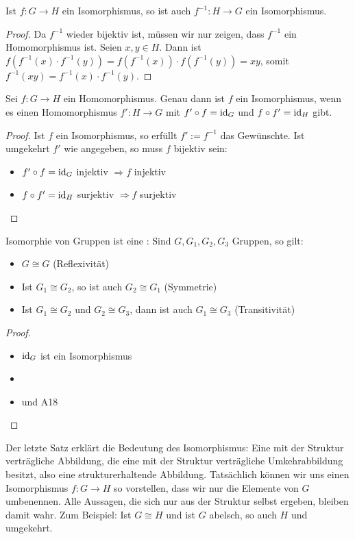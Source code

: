 \begin{lemma}
	Ist $f:G\to H$ ein Isomorphismus, so ist auch $f^{-1}:H\to G$ ein Isomorphismus.
\end{lemma}
\begin{proof}
	Da $f^{-1}$ wieder bijektiv ist, müssen wir nur zeigen, dass $f^{-1}$ ein Homomorphismus ist. Seien $x,y\in H$. Dann 
	ist $f(f^{-1}(x)\cdot f^{-1}(y))=f(f^{-1}(x))\cdot f(f^{-1}(y))=xy$, somit $f^{-1}(xy)=f^{-1}(x)\cdot f^{-1}(y)$.
\end{proof}

\begin{proposition}
	Sei $f:G\to H$ ein Homomorphismus. Genau dann ist $f$ ein Isomorphismus, wenn es einen Homomorphismus 
	$f':H\to G$ mit $f'\circ f=\operatorname{id}_G$ und $f\circ f'=\operatorname{id}_H$ gibt.
\end{proposition}
\begin{proof}
	Ist $f$ ein Isomorphismus, so erfüllt $f':=f^{-1}$ das Gewünschte. Ist umgekehrt $f'$ wie angegeben, so muss $f$ 
	bijektiv sein:
	\begin{itemize}
		\item $f'\circ f=\operatorname{id}_G$ injektiv $\Rightarrow f$ injektiv
		\item $f\circ f'=\operatorname{id}_H$ surjektiv $\Rightarrow f$ surjektiv
	\end{itemize}
\end{proof}

\begin{conclusion}
	Isomorphie von Gruppen ist eine : Sind $G,G_1,G_2,G_3$ Gruppen, so gilt:
	\begin{itemize}
		\item $G\cong G$ (Reflexivität)
		\item Ist $G_1\cong G_2$, so ist auch $G_2\cong G_1$ (Symmetrie)
		\item Ist $G_1\cong G_2$ und $G_2\cong G_3$, dann ist auch $G_1\cong G_3$ (Transitivität)
	\end{itemize}
\end{conclusion}
\begin{proof}
	\begin{itemize}
		\item $\operatorname{id}_G$ ist ein Isomorphismus
		\item {}
		\item {} und A18
	\end{itemize}
\end{proof}

\begin{remark}
	Der letzte Satz erklärt die Bedeutung des Isomorphismus: Eine mit der Struktur verträgliche 
	Abbildung, die eine mit der Struktur verträgliche Umkehrabbildung besitzt, also eine strukturerhaltende Abbildung. 
	Tatsächlich können wir uns einen Isomorphismus $f: G\to H$ so vorstellen, dass wir nur die Elemente von $G$ umbenennen. 
	Alle Aussagen, die sich nur aus der Struktur selbst ergeben, bleiben damit wahr. Zum Beispiel: Ist $G\cong H$ und ist 
	$G$ abelsch, so auch $H$ und umgekehrt.
\end{remark}

